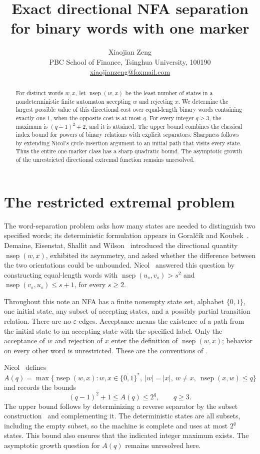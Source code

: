 \documentclass[11pt,a4paper]{article}
\title{Exact directional NFA separation\\for binary words with one marker}
\author{Xiaojian Zeng\\
  \small PBC School of Finance, Tsinghua University, 100190\\
  \small \href{mailto:xiaojianzeng@foxmail.com}{xiaojianzeng@foxmail.com}}
\date{}
\DeclareMathOperator{\nsep}{nsep}
\begin{document}
\maketitle

\begin{abstract}
For distinct words \(w,x\), let \(\nsep(w,x)\) be the least number of
states in a nondeterministic finite automaton accepting \(w\) and rejecting
\(x\). We determine the largest possible value of this directional cost
over equal-length binary words containing exactly one \(1\), when the
opposite cost is at most \(q\). For every integer \(q\geq3\), the maximum is
\((q-1)^2+2\), and it is attained. The upper bound combines the classical
index bound for powers of binary relations with explicit separators.
Sharpness follows by extending Nicol's cycle-insertion argument to an
initial path that visits every state. Thus the entire one-marker class
has a sharp quadratic bound. The asymptotic growth of the unrestricted
directional extremal function remains unresolved.
\end{abstract}

\section{The restricted extremal problem}

The word-separation problem asks how many states are needed to distinguish
two specified words; its deterministic formulation appears in
Goralčík and Koubek~\cite{goralcik1986}.
Demaine, Eisenstat, Shallit and Wilson~\cite[Section~6]{demaine2011}
introduced the directional quantity \(\nsep(w,x)\), exhibited its
asymmetry, and asked whether the difference between the two orientations
could be unbounded. Nicol~\cite[Theorem~6]{nicol2026} answered this question
by constructing equal-length words with
\(\nsep(u_s,v_s)>s^2\) and \(\nsep(v_s,u_s)\leq s+1\), for every \(s\geq2\).

Throughout this note an NFA has a finite nonempty state set, alphabet
\(\{0,1\}\), one initial state, any subset of accepting states, and a
possibly partial transition relation. There are no \(\varepsilon\)-edges.
Acceptance means the existence of a path from the initial state to an
accepting state with the specified label. Only the acceptance of \(w\)
and rejection of \(x\) enter the definition of \(\nsep(w,x)\); behavior on
every other word is unrestricted. These are the conventions of
\cite[Section~4]{nicol2026}.

Nicol~\cite[Section~4.1]{nicol2026} defines
\[
 A(q)=\max\{\nsep(w,x): w,x\in\{0,1\}^*,\
       |w|=|x|,\ w\ne x,\ \nsep(x,w)\leq q\}
\]
and records the bounds
\begin{equation}\label{eq:prior}
 (q-1)^2+1\leq A(q)\leq 2^q,\qquad q\geq3.
\end{equation}
The upper bound follows by determinizing a reverse separator by the
subset construction~\cite[Definition~11 and Theorem~11]{rabin1959}
and complementing it. The deterministic states are all subsets, including
the empty subset, so the machine is complete and uses at most \(2^q\)
states. This bound also ensures that the indicated integer maximum exists.
The asymptotic growth question for \(A(q)\) remains unresolved here.
\end{document}
